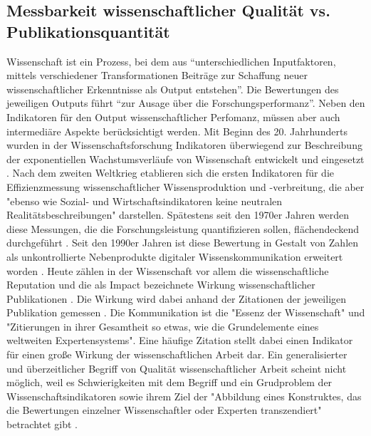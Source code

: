 \subsection{Messbarkeit wissenschaftlicher Qualität vs. Publikationsquantität}
Wissenschaft ist ein Prozess, bei dem aus “unterschiedlichen Inputfaktoren, mittels verschiedener Transformationen Beiträge zur Schaffung neuer wissenschaftlicher Erkenntnisse als Output entstehen”\cite{Jansen_2007}. Die Bewertungen des jeweiligen Outputs führt “zur Ausage über die Forschungsperformanz”. Neben den Indikatoren für den Output wissenschaftlicher Perfomanz, müssen aber auch intermediäre Aspekte berücksichtigt werden\cite{schmoch_2009}. Mit Beginn des 20. Jahrhunderts wurden in der Wissenschaftsforschung Indikatoren überwiegend zur Beschreibung der exponentiellen Wachstumsverläufe von Wissenschaft entwickelt und eingesetzt \cite{Hornbostel_1997}. Nach dem zweiten Weltkrieg etablieren sich die ersten Indikatoren für die Effizienzmessung wissenschaftlicher Wissensproduktion und -verbreitung, die aber "ebenso wie Sozial- und Wirtschaftsindikatoren keine neutralen Realitätsbeschreibungen" \cite{Hornbostel_1997} darstellen. Spätestens seit den 1970er Jahren werden diese Messungen, die die Forschungsleistung quantifizieren sollen, flächendeckend durchgeführt \cite{Hornbostel_1997}. Seit den 1990er Jahren ist diese Bewertung in Gestalt von Zahlen als unkontrollierte Nebenprodukte digitaler Wissenskommunikation erweitert worden \cite{angermueller_2010}. Heute zählen in der Wissenschaft vor allem die wissenschaftliche Reputation und die als Impact bezeichnete Wirkung wissenschaftlicher Publikationen\cite{herb_open_2013} \cite{Hornbostel_1997}. Die Wirkung wird dabei anhand der Zitationen der jeweiligen Publikation gemessen \cite{suchen}. Die Kommunikation ist die "Essenz der Wissenschaft"\cite{bonitz_1998_matthaus} und "Zitierungen in ihrer Gesamtheit so etwas, wie die Grundelemente eines weltweiten Expertensystems"\cite{bonitz_1990_sci}. Eine häufige Zitation stellt dabei einen Indikator für einen große Wirkung der wissenschaftlichen Arbeit dar. Ein generalisierter und überzeitlicher Begriff von Qualität wissenschaftlicher Arbeit scheint nicht möglich, weil es Schwierigkeiten mit dem Begriff und ein Grudproblem der Wissenschaftsindikatoren sowie ihrem Ziel der "Abbildung eines Konstruktes, das die Bewertungen einzelner Wissenschaftler oder Experten transzendiert" betrachtet gibt \cite{Hornbostel_1997}. 


